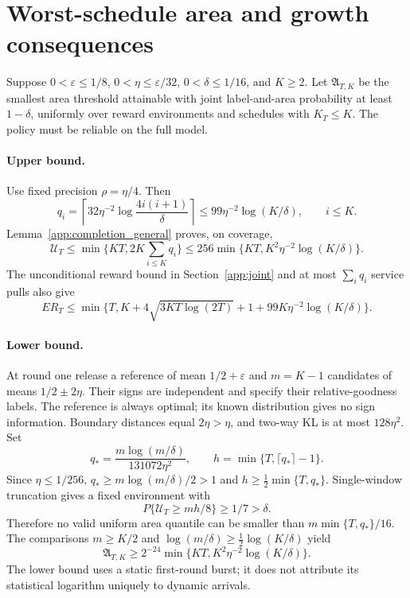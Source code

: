 \section{Worst-schedule area and growth consequences}
\label{app:worst_area}

Suppose $0<\varepsilon\le1/8$, $0<\eta\le\varepsilon/32$,
$0<\delta\le1/16$, and $K\ge2$. Let $\mathfrak A_{T,K}$ be the smallest
area threshold attainable with joint label-and-area probability at least
$1-\delta$, uniformly over reward environments and schedules with $K_T\le K$.
The policy must be reliable on the full model.

\paragraph{Upper bound.}
Use fixed precision $\rho=\eta/4$. Then
\[
 q_i=\left\lceil32\eta^{-2}\log\frac{4i(i+1)}\delta\right\rceil
 \le99\eta^{-2}\log(K/\delta),\qquad i\le K.
\]
Lemma~\ref{app:completion_general} proves, on coverage,
\[
 \mathcal U_T\le\min\{KT,2K\sum_{i\le K}q_i\}
 \le256\min\{KT,K^2\eta^{-2}\log(K/\delta)\}.
\]
The unconditional reward bound in Section~\ref{app:joint} and at most $\sum_iq_i$ service pulls also give
\[
 ER_T\le\min\{T,K+4\sqrt{3KT\log(2T)}+1+
                  99K\eta^{-2}\log(K/\delta)\}.
\]

\paragraph{Lower bound.}
At round one release a reference of mean $1/2+\varepsilon$ and
$m=K-1$ candidates of means $1/2\pm2\eta$. Their signs are independent and
specify their relative-goodness labels. The reference is always optimal;
its known distribution gives no sign information. Boundary distances equal
$2\eta>\eta$, and two-way KL is at most $128\eta^2$. Set
\[
 q_* =\frac{m\log(m/\delta)}{131072\eta^2},\qquad
 h=\min\{T,\lceil q_*\rceil-1\}.
\]
Since $\eta\le1/256$, $q_*\ge m\log(m/\delta)/2>1$ and
$h\ge\frac12\min\{T,q_*\}$. Single-window truncation gives a fixed
environment with
\[
 P\{\mathcal U_T\ge mh/8\}\ge1/7>\delta.
\]
Therefore no valid uniform area quantile can be smaller than
$m\min\{T,q_*\}/16$. The comparisons
$m\ge K/2$ and $\log(m/\delta)\ge\frac12\log(K/\delta)$ yield
\[
 \mathfrak A_{T,K}\ge
 2^{-24}\min\{KT,K^2\eta^{-2}\log(K/\delta)\}.
\]
The lower bound uses a static first-round burst; it does not attribute its
statistical logarithm uniquely to dynamic arrivals.

